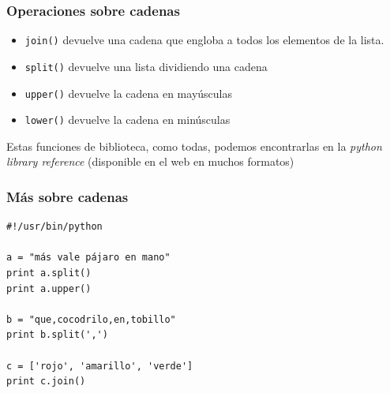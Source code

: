 \documentclass{beamer}
\begin{document}
\begin{frame}[fragile]
\frametitle{Operaciones sobre cadenas}

\begin{itemize}
\item \verb|join()| devuelve una cadena que engloba a todos los elementos de la lista.\\
\item \verb|split()| devuelve una lista dividiendo una cadena\\
\item \verb|upper()| devuelve la cadena en mayúsculas\\
\item \verb|lower()| devuelve la cadena en minúsculas\\
\end{itemize}

Estas funciones de biblioteca, como todas, podemos encontrarlas
en la \emph{python library reference}
(disponible en el web en muchos formatos)

\end{frame}



\begin{frame}[fragile]

\frametitle{Más sobre cadenas}  

  \begin{footnotesize}
\begin{verbatim}
#!/usr/bin/python

a = "más vale pájaro en mano"
print a.split()
print a.upper()

b = "que,cocodrilo,en,tobillo"
print b.split(',')

c = ['rojo', 'amarillo', 'verde']
print c.join()

\end{verbatim}
  \end{footnotesize}



  
\end{frame}
\end{document}
